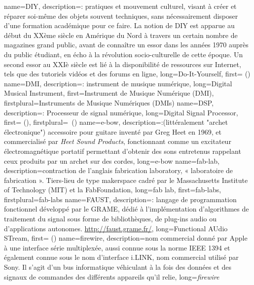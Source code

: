 {
    name={DIY},
    description={\textit{}: pratiques et mouvement culturel, visant à créer et réparer soi-même des objets souvent techniques, sans nécessairement disposer d'une formation académique pour ce faire. La notion de DIY est apparue au début du XXème siècle en Amérique du Nord à travers un certain nombre de magazines grand public, avant de connaître un essor dans les années 1970 auprès du public étudiant, en écho à la révolution socio-culturelle de cette époque. Un second essor au XXIè siècle est lié à la disponibilité de ressources sur Internet, tels que des tutoriels vidéos et des forums en ligne},
    long={Do-It-Yourself},
    first={ ()}
}
{
    name={DMI},
    description={\textit{}: instrument de musique numérique},
    long={Digital Musical Instrument},
    first={Instrument de Musique Numérique (DMI)},
    firstplural={Instruments de Musique Numériques (DMIs)}
}
{
    name={DSP},
    description={\textit{}: Processeur de signal numérique},
    long={Digital Signal Processor},
    first={ ()},
    firstplural={\glspluralsuffix\ (\glspluralsuffix)}
}
{
    name={e-bow},
    description={\textit{}:(littéralement "archet électronique") accessoire pour guitare inventé par Greg Heet en 1969, et commercialisé par \textit{Heet Sound Products}, fonctionnant comme un excitateur électromagnétique portatif permettant d'obtenir des sons entretenus rappelant ceux produits par un archet sur des cordes},
    long={e-bow}
}
{
    name={fab-lab},
    description={contraction de l'anglais fabrication laboratory, « laboratoire de fabrication ». Tiers-lieu de type \gls{makerspace} cadré par le Massachusetts Institute of Technology (MIT) et la FabFoundation},
    long={fab lab},
    first={fab-labs},
    firstplural={fab-labs}
}
{
    name={FAUST},
    description={\textit{}: langage de programmation fonctionnel développé par le \gls{GRAME}, dédié à l'implémentation d'algorithmes de traitement du signal sous forme de bibliothèques, de plug-ins audio ou d'applications autonomes. \url{http://faust.grame.fr/}},
    long={Functional AUdio STream},
    first={ ()}
}
{
    name={firewire},
    description={nom commercial donné par Apple à une interface série multiplexée, aussi connue sous la norme IEEE 1394 et également connue sous le nom d'interface i.LINK, nom commercial utilisé par Sony. Il s'agit d'un bus informatique véhiculant à la fois des données et des signaux de commandes des différents appareils qu'il relie},
    long={\textit{firewire}}
}
